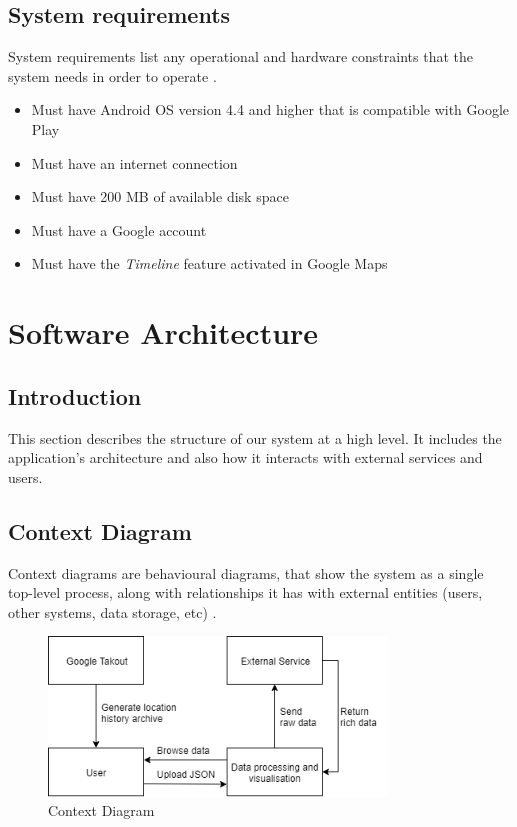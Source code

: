 \documentclass[12p]{article}
\begin{document}
\subsection{System requirements} \label{sec:SystemRequirements}
System requirements list any operational and hardware constraints that the system needs in order to operate \cite{Requirements}.
\begin{itemize}
    \item Must have Android OS \cite{Android} version 4.4 and higher that is compatible with Google Play\cite{AndroidPlayStore}
    \item Must have an internet connection
    \item Must have 200 MB of available disk space
    \item Must have a Google account
    \item Must have the \textit{Timeline} feature activated in Google Maps
\end{itemize}

		
\newpage
\section{Software Architecture} \label{sec:SoftwareArchitecture}
    \subsection{Introduction}
    This section describes the structure of our system at a high level. It includes the application's architecture and also how it interacts with external services and users.
    
    \subsection{Context Diagram}
    Context diagrams are behavioural diagrams, that show the system as a single top-level process, along with relationships it has with external entities (users, other systems, data storage, etc) \cite{ContextDiagram}.
    
    \begin{figure}[H]
        \center
        \includegraphics[width=0.8\textwidth,keepaspectratio]{pics/diagrams/ContextDiagram.png}
	    \caption{Context Diagram}
    \end{figure}
    
\end{document}
